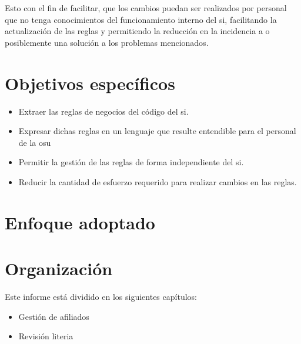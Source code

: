 Esto con el fin de facilitar, que los cambios puedan ser realizados por personal que no tenga conocimientos del funcionamiento interno del \acrshort{si}, facilitando la actualización de las reglas y permitiendo la reducción en la incidencia a o posiblemente una solución a los problemas mencionados.

\section{Objetivos específicos}
\begin{itemize}
	\item Extraer las reglas de negocios del código del \acrlong{si}.
	\item Expresar dichas reglas en un lenguaje que resulte entendible para el personal de la \acrlong{osu}
	\item Permitir la gestión de las reglas de forma independiente del \acrshort{si}.
	\item Reducir la cantidad de esfuerzo requerido para realizar cambios en las reglas.
\end{itemize}

\section{Enfoque adoptado}


\section{Organización}


Este informe está dividido en los siguientes capítulos:
\begin{itemize}
	\item Gestión de afiliados
	\item Revisión literia
\end{itemize}
